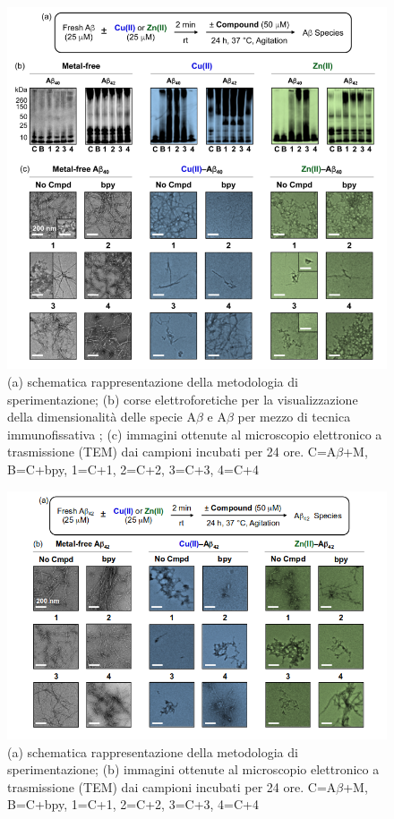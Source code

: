 \documentclass[a4paper, 12pt]{article}
\begin{document}
\begin{figure}[H]
	\centering
	\includegraphics[width=\linewidth]{immagini/ris_bpy.png}
	\caption{(a) schematica rappresentazione della metodologia di sperimentazione; (b) corse elettroforetiche per la visualizzazione della dimensionalità delle specie A$\beta$ e A$\beta$ per mezzo di tecnica immunofissativa \cite{kurien_western_2006}; (c) immagini ottenute al microscopio elettronico a trasmissione (TEM) dai campioni incubati per 24 ore. C=A$\beta$+M, B=C+bpy, 1=C+1, 2=C+2, 3=C+3, 4=C+4 }
	\label{fig:ris_bpy}
\end{figure}

\begin{figure}[H]
	\centering
	\includegraphics[width=\linewidth]{immagini/ris_bpy2.png}
	\caption{(a) schematica rappresentazione della metodologia di sperimentazione; (b) immagini ottenute al microscopio elettronico a trasmissione (TEM) dai campioni incubati per 24 ore. C=A$\beta$+M, B=C+bpy, 1=C+1, 2=C+2, 3=C+3, 4=C+4 }
	\label{fig:ris_bpy2}
\end{figure}
\end{document}
